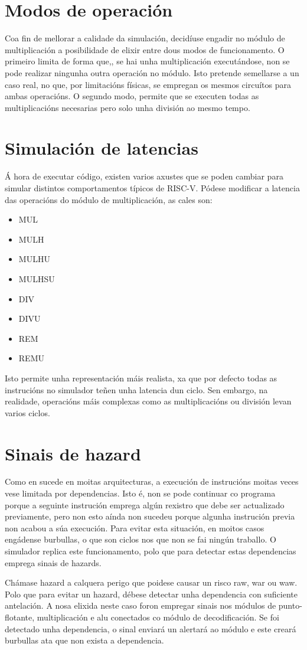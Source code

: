 \section{Modos de operación}\label{sec:modos_op}
Coa fin de mellorar a calidade da simulación, decidíuse engadir no módulo de multiplicación a posibilidade de elixir entre dous modos de funcionamento. O primeiro limita de forma que,, se hai unha multiplicación executándose, non se pode realizar ningunha outra operación no módulo. Isto pretende semellarse a un caso real, no que, por limitacións físicas, se empregan os mesmos circuítos para ambas operacións. O segundo modo, permite que se executen todas as multiplicacións necesarias pero solo unha división ao mesmo tempo.


\section{Simulación de latencias}\label{sec:sim_latencias}
Á hora de executar código, existen varios axustes que se poden cambiar para simular distintos comportamentos típicos de RISC-V. Pódese modificar a latencia  das operacións do módulo de multiplicación, as cales son: 
\begin{itemize}
    \item MUL
    \item MULH
    \item MULHU
    \item MULHSU
    \item DIV
    \item DIVU
    \item REM
    \item REMU
\end{itemize}
Isto permite unha representación máis realista, xa que por defecto todas as instrucións no simulador teñen unha latencia dun ciclo. Sen embargo, na realidade, operacións máis complexas como as multiplicacións ou división levan varios ciclos.

\section{Sinais de hazard}\label{sec:hazards}
Como en sucede en moitas \gls{arquitecturas}, a execución de instrucións moitas veces vese limitada por dependencias. Isto é, non se pode continuar co programa porque a seguinte instrución emprega algún rexistro que debe ser actualizado previamente, pero non esto aínda non sucedeu porque algunha instrución previa non acabou a súa execución. Para evitar esta situación, en moitos casos engádense burbullas, o que son ciclos nos que non se fai ningún traballo. O simulador replica este funcionamento, polo que para detectar estas dependencias emprega sinais de \gls{hazards}.

Chámase hazard a calquera perigo que poidese causar un risco \acrfull{raw}, \acrfull{war} ou \acrfull{waw}. Polo que para evitar un hazard, débese detectar unha dependencia con suficiente antelación. A nosa elixida neste caso foron empregar sinais nos módulos de punto-flotante, multiplicación e \acrshort{alu} conectados co módulo de decodificación. Se foi detectado unha dependencia, o sinal enviará un alertará ao módulo e este creará burbullas ata que non exista a dependencia.